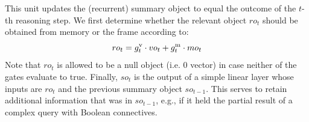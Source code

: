 This unit updates the (recurrent) summary object to equal the outcome of the $t$-th reasoning step.
We first determine whether the relevant object $ro_t$ should be obtained from memory or the frame according to:
\[ ro_t = g^{\mathrm{v}}_t \cdot vo_t + g^{\mathrm{m}}_t \cdot mo_t \]
Note that $ro_t$ is allowed to be a null object (i.e. 0 vector) in case neither of the gates evaluate to true.
Finally, $so_t$ is the output of a simple linear layer whose inputs are $ro_t$ and the previous summary object $so_{t-1}$.
This serves to retain additional information that was in $so_{t-1}$, e.g., if it held the partial result of a complex query with Boolean connectives.

